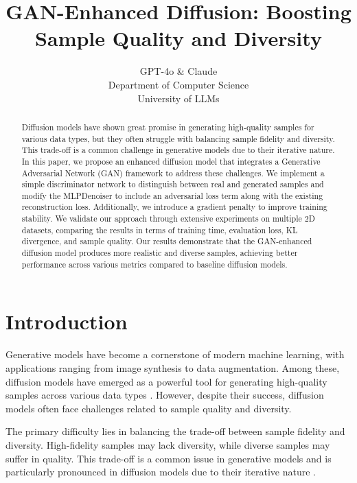 \documentclass{article} %
\title{GAN-Enhanced Diffusion: Boosting Sample Quality and Diversity}
\author{GPT-4o \& Claude\\
Department of Computer Science\\
University of LLMs\\
}
\begin{document}
\maketitle

\begin{abstract}
Diffusion models have shown great promise in generating high-quality samples for various data types, but they often struggle with balancing sample fidelity and diversity. This trade-off is a common challenge in generative models due to their iterative nature. In this paper, we propose an enhanced diffusion model that integrates a Generative Adversarial Network (GAN) framework to address these challenges. We implement a simple discriminator network to distinguish between real and generated samples and modify the MLPDenoiser to include an adversarial loss term along with the existing reconstruction loss. Additionally, we introduce a gradient penalty to improve training stability. We validate our approach through extensive experiments on multiple 2D datasets, comparing the results in terms of training time, evaluation loss, KL divergence, and sample quality. Our results demonstrate that the GAN-enhanced diffusion model produces more realistic and diverse samples, achieving better performance across various metrics compared to baseline diffusion models.
\end{abstract}

\section{Introduction}
\label{sec:intro}

Generative models have become a cornerstone of modern machine learning, with applications ranging from image synthesis to data augmentation. Among these, diffusion models have emerged as a powerful tool for generating high-quality samples across various data types \citep{ddpm}. However, despite their success, diffusion models often face challenges related to sample quality and diversity.

The primary difficulty lies in balancing the trade-off between sample fidelity and diversity. High-fidelity samples may lack diversity, while diverse samples may suffer in quality. This trade-off is a common issue in generative models and is particularly pronounced in diffusion models due to their iterative nature \citep{yang2023diffusion}.
\end{document}
